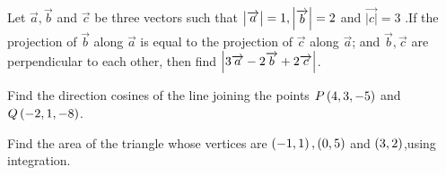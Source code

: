 \item Let  $ \overrightarrow a ,\overrightarrow b$ and $\overrightarrow c $ be three vectors such that $\begin{vmatrix}\overrightarrow{a}\end{vmatrix}  = 1 ,\begin{vmatrix}\overrightarrow{b}\end{vmatrix}= 2$ and $\overrightarrow{|c|} =3$ .If the projection of $\overrightarrow b $ along $\overrightarrow a $ is equal to the projection of $\overrightarrow c $ along $ \overrightarrow a $; and $\overrightarrow b,\overrightarrow c $ are perpendicular to each other, then find $\left\vert3\overrightarrow a-2\overrightarrow b +2\overrightarrow c\right\vert$.

\item Find the direction cosines of the line joining the points $P \left(4, 3, -5\right)$ and $Q  \left(-2, 1, -8\right)$.

\item Find the area of the triangle whose vertices are $\left(-1, 1\right),\left(0, 5\right)$ and $\left(3, 2\right)$,using integration.
